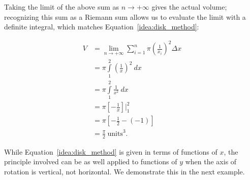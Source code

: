 \begin{example}
Taking the limit of the above sum as $n\to+\infty$ gives the actual volume; recognizing this sum as a Riemann sum allows us to evaluate the limit with a definite integral, which matches Equation~\eqref{idea:disk_method}:

\allowdisplaybreaks
\begin{align*}
	V &= \lim_{n\to+\infty}\sum_{i=1}^n \pi \left(\frac1{x_i}\right)^2\Delta x\\[0.2cm]
		&= \pi\int\limits_1^2 \left(\frac1x\right)^2\ dx \\[0.2cm]
		&= \pi\int\limits_1^2 \frac1{x^2}\ dx\\[0.2cm]
		&= \pi\left[-\frac1x\right]\Bigg|_1^2 \\
		&= \pi \left[-\frac12 - \left(-1\right)\right] \\
		&= \frac{\pi}{2}\ \text{units}^3.
\end{align*}





\end{example}


While Equation~\eqref{idea:disk_method} is given in terms of functions of $x$, the principle involved can be as well applied to functions of $y$ when the axis of rotation is vertical, not horizontal. We demonstrate this in the next example.

